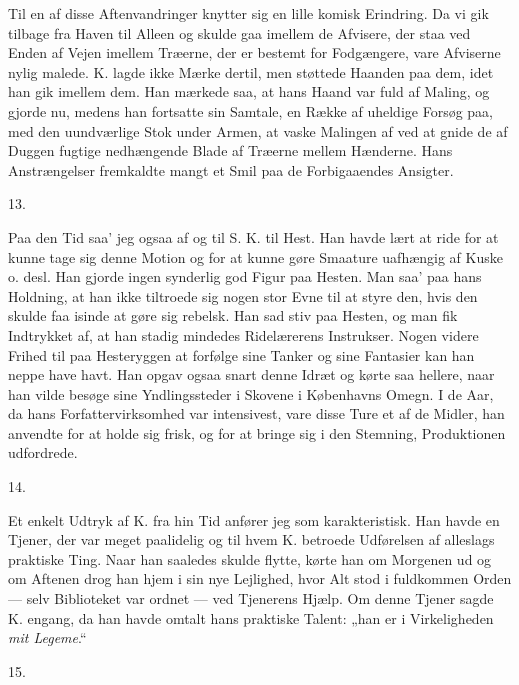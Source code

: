 \documentclass[12pt,a4paper,openany]{book}
\newcommand{\secnum}[1]{\par\begin{center}#1\end{center}\par\nobreak}
\newcommand{\opage}[1]{\marginnote{\footnotesize\textit{[#1]}}}
\begin{document}
Til en af disse Aftenvandringer knytter sig en lille komisk
Erindring. Da vi gik tilbage fra Haven til Alleen og skulde gaa
imellem de Afvisere, der staa ved Enden af Vejen imellem Træerne,
der er bestemt for Fodgængere, vare Afviserne nylig malede. K.
lagde ikke Mærke dertil, men støttede Haanden paa dem, idet han
gik imellem dem. Han mærkede saa, at hans Haand var fuld af
Maling, og gjorde nu, medens han fortsatte sin Samtale, en Række
af uheldige Forsøg paa, med den uundværlige Stok under Armen, at
vaske Malingen af ved at gnide de af Duggen fugtige nedhængende
Blade af Træerne mellem Hænderne. Hans Anstrængelser fremkaldte
mangt et Smil paa de Forbigaaendes Ansigter.

\secnum{13.}

Paa den Tid saa’ jeg ogsaa af og til S. K. til Hest. Han havde
lært at ride for at kunne tage sig denne Motion og for at kunne
gøre Smaature uafhængig af Kuske o. desl. Han gjorde ingen
synderlig god Figur paa Hesten. Man saa’ paa hans Holdning, at
han ikke tiltroede sig nogen stor Evne til at styre den, hvis den
skulde faa isinde at gøre sig rebelsk. Han sad stiv paa Hesten,
og man fik Indtrykket af, at han stadig mindedes Ridelærerens
Instrukser. Nogen videre Frihed til paa Hesteryggen at forfølge
sine Tanker og sine Fantasier kan han neppe have havt. Han opgav
ogsaa snart denne Idræt og kørte saa hellere, naar han vilde
besøge sine Yndlingssteder i Skovene i Københavns Omegn. I de
Aar, da hans Forfattervirksomhed var intensivest, vare disse Ture
et af de Midler, han anvendte for at holde
\opage{348}sig frisk, og for at bringe sig i den Stemning,
Produktionen udfordrede.

\secnum{14.}

Et enkelt Udtryk af K. fra hin Tid anfører jeg som karakteristisk.
Han havde en Tjener, der var meget paalidelig og til hvem K.
betroede Udførelsen af alleslags praktiske Ting. Naar han saaledes
skulde flytte, kørte han om Morgenen ud og om Aftenen drog han
hjem i sin nye Lejlighed, hvor Alt stod i fuldkommen Orden --- selv
Biblioteket var ordnet --- ved Tjenerens Hjælp. Om denne Tjener
sagde K. engang, da han havde omtalt hans praktiske Talent: „han
er i Virkeligheden \emph{mit Legeme}.“

\secnum{15.}
\end{document}
